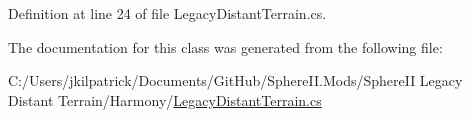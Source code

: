 Definition at line 24 of file Legacy\+Distant\+Terrain.\+cs.



The documentation for this class was generated from the following file\+:\begin{DoxyCompactItemize}
\item 
C\+:/\+Users/jkilpatrick/\+Documents/\+Git\+Hub/\+Sphere\+I\+I.\+Mods/\+Sphere\+I\+I Legacy Distant Terrain/\+Harmony/\mbox{\hyperlink{_legacy_distant_terrain_8cs}{Legacy\+Distant\+Terrain.\+cs}}\end{DoxyCompactItemize}
